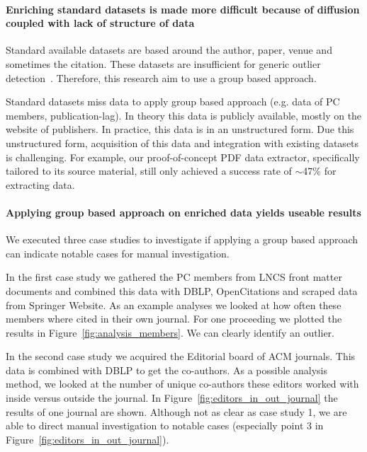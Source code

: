 \documentclass{ou-report}
\newcommand{\lncs}{LNCS}
\newcommand{\dblp}{DBLP}
\begin{document}
\paragraph{Enriching standard datasets is made more difficult because of 
diffusion coupled with lack of structure of data}
Standard available datasets are based around the author, paper, venue and 
sometimes the citation. These datasets are insufficient for generic outlier 
detection~\cite{TEJ2017}. Therefore, this research aim to use a group based 
approach.

Standard datasets miss data to apply group based approach (e.g. data of PC 
members, publication-lag). In theory this data is publicly available, mostly on 
the website of publishers. In practice, this data is in an unstructured form.
Due this unstructured form, acquisition of this data and integration with
existing datasets is challenging. For example, our proof-of-concept PDF data
extractor, specifically tailored to its source material, still only achieved
a success rate of $\sim$47\% for extracting data.


\paragraph{Applying group based approach on enriched data yields useable results}
We executed three case studies to investigate if applying a group based approach 
can indicate notable cases for manual investigation.

In the first case study we gathered the PC members from \lncs{} front matter 
documents and combined this data with \dblp{}, OpenCitations and scraped data 
from Springer Website. As an example analyses we looked at how often these 
members where cited in their own journal. For one proceeding we plotted the 
results in Figure~\ref{fig:analysis_members}. We can clearly identify an 
outlier.

In the second case study we acquired the Editorial board of ACM journals. This 
data is combined with \dblp{} to get the co-authors. As a possible analysis 
method, we looked at the number of unique co-authors these editors worked with 
inside versus outside the journal. In Figure~\ref{fig:editors_in_out_journal} 
the results of one journal are shown. Although not as clear as case study 1, we 
are able to direct manual investigation to notable cases (especially point 3
in Figure~\ref{fig:editors_in_out_journal}).
\end{document}
